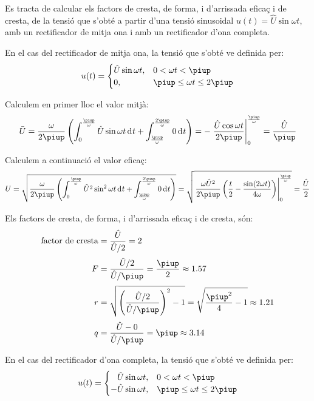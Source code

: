 \begin{exemple}
    Es tracta de calcular els factors de cresta, de forma, i d'arrissada eficaç i de cresta,
    de la tensió  que s'obté a partir d'una tensió sinusoidal
    $u(t) = \hat{U} \sin\omega t$, amb un rectificador de mitja ona i
    amb un rectificador d'ona completa.

    En el cas del rectificador de mitja ona, la tensió que s'obté ve
    definida per:
    \[
    u(t) = \begin{cases} \hat{U} \sin\omega t, & 0 < \omega t < \piup\\
           0, & \piup \leq \omega t \leq 2\piup \end{cases}
    \]

    Calculem en primer lloc el valor mitjà:
    \[
    \bar{U} = \frac{\omega}{2\piup} \left( \int_0^\frac{\piup}{\omega}
    \hat{U} \sin\omega t \diff t +
    \int_\frac{\piup}{\omega}^\frac{2\piup}{\omega} 0 \diff t \right) = -
    \left. \frac{\hat{U} \cos\omega t}{2\piup}
    \right|_0^\frac{\piup}{\omega} = \frac{\hat{U}}{\piup}
    \]

    Calculem a continuació el valor eficaç:
    \[
    U = \sqrt{\frac{\omega}{2\piup} \left( \int_0^\frac{\piup}{\omega}
    \hat{U}^2 \sin^2\omega t \diff t +
    \int_\frac{\piup}{\omega}^\frac{2\piup}{\omega} 0 \diff t \right)} =
      \sqrt{\left.\frac{\omega \hat{U}^2}{2\piup}\left( \frac{t}{2} -
    \frac{\sin (2\omega t)}{4\omega}
    \right)\right|_0^\frac{\piup}{\omega}} = \frac{\hat{U}}{2}
    \]

    Els factors de cresta, de forma, i d'arrissada eficaç i de cresta, són:
    \begin{align*}
        \text{factor de cresta} &= \frac{\hat{U}}{\hat{U}/2} = 2 \\[0.5ex]
        F &= \frac{\hat{U}/2}{\hat{U}/\piup} =\frac{\piup}{2} \approx
        \num{1,57} \\[0.5ex]
        r &= \sqrt{\left(\frac{\hat{U}/2}{\hat{U}/\piup}\right)^2-1} =
    \sqrt{\frac{\piup^2}{4}-1} \approx \num{1,21} \\[0.5ex]
        q &= \frac{\hat{U} - 0}{\hat{U}/\piup} = \piup \approx \num{3,14}
    \end{align*}


    En el cas del rectificador d'ona completa, la tensió que s'obté ve
    definida per:
    \[
    u(t) = \begin{cases} \phantom{-}\hat{U} \sin\omega t, & 0 < \omega t < \piup\\
           -\hat{U} \sin\omega t, & \piup \leq \omega t \leq 2\piup \end{cases}
    \]


\end{exemple}
